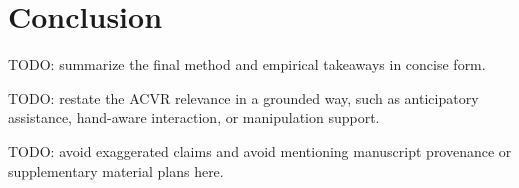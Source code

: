 \section{Conclusion}

TODO: summarize the final method and empirical takeaways in concise form.

TODO: restate the ACVR relevance in a grounded way, such as anticipatory assistance, hand-aware interaction, or manipulation support.

TODO: avoid exaggerated claims and avoid mentioning manuscript provenance or supplementary material plans here.
